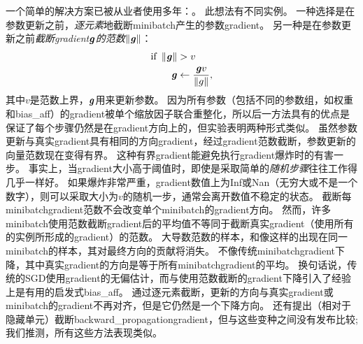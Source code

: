 一个简单的解决方案已被从业者使用多年：。
此想法有不同实例\citep{Mikolov-thesis-2012,Pascanu+al-ICML2013-small}。
一种选择是在参数更新之前，\emph{逐元素}地截断\gls{minibatch}产生的参数\gls{gradient}\citep{Mikolov-thesis-2012}。
另一种是在参数更新之前\emph{截断\gls{gradient}$\boldsymbol{\mathit{g}}$的范数$\left\lVert \boldsymbol{\mathit{g}} \right\rVert$}\citep{Pascanu+al-ICML2013-small}：
\begin{align}
 \text{if}~ \left\lVert\boldsymbol{\mathit{g}}\right\rVert &> v \\
 \boldsymbol{\mathit{g}} &\gets \frac{\boldsymbol{\mathit{g}} v}{\left\lVert g\right\rVert},
\end{align}
其中$v$是范数上界，$\boldsymbol{\mathit{g}}$用来更新参数。
因为所有参数（包括不同的参数组，如权重和\gls{bias_aff}）的\gls{gradient}被单个缩放因子联合重整化，所以后一方法具有的优点是保证了每个步骤仍然是在\gls{gradient}方向上的，但实验表明两种形式类似。
虽然参数更新与真实\gls{gradient}具有相同的方向\gls{gradient}，经过\gls{gradient}范数截断，参数更新的向量范数现在变得有界。
这种有界\gls{gradient}能避免执行\gls{gradient}爆炸时的有害一步。
事实上，当\gls{gradient}大小高于阈值时，即使是采取简单的\emph{随机步骤}往往工作得几乎一样好。
如果爆炸非常严重，\gls{gradient}数值上为Inf或Nan（无穷大或不是一个数字），则可以采取大小为$v$的随机一步，通常会离开数值不稳定的状态。
截断每\gls{minibatch}\gls{gradient}范数不会改变单个\gls{minibatch}的\gls{gradient}方向。
然而，许多\gls{minibatch}使用范数截断\gls{gradient}后的平均值不等同于截断真实\gls{gradient}（使用所有的实例所形成的\gls{gradient}）的范数。
大导数范数的样本，和像这样的出现在同一\gls{minibatch}的样本，其对最终方向的贡献将消失。
不像传统\gls{minibatch}\gls{gradient}下降，其中真实\gls{gradient}的方向是等于所有\gls{minibatch}\gls{gradient}的平均。
换句话说，传统的\gls{SGD}使用\gls{gradient}的无偏估计，而与使用范数截断的\gls{gradient}下降引入了经验上是有用的启发式\gls{bias_aff}。
通过逐元素截断，更新的方向与真实\gls{gradient}或\gls{minibatch}的\gls{gradient}不再对齐，但是它仍然是一个下降方向。
还有提出\citep{Graves-arxiv2013}（相对于隐藏单元）截断\gls{backward_propagation}\gls{gradient}，但与这些变种之间没有发布比较; 我们推测，所有这些方法表现类似。


